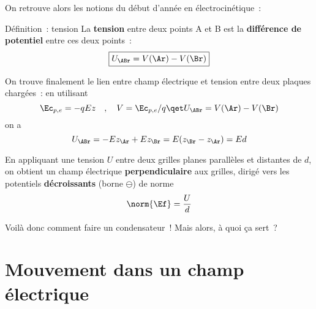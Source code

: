 \documentclass[../main/main.tex]{subfiles}
\begin{document}
On retrouve alors les notions du début d'année en électrocinétique~:

\begin{tdefi}{Définition~: tension}
    La \textbf{tension} entre deux points A et B est la \textbf{différence de
    potentiel} entre ces deux points~:
    \[\boxed{U_{\ABr} = V(\Ar) - V(\Br)}\]
\end{tdefi}

On trouve finalement le lien entre champ électrique et tension entre deux
plaques chargées~: en utilisant
\[
    \Ec_{p,e} = -qEz
    \quad,\quad
    V = \Ec_{p,e}/q
    \qet
    U_{\ABr} = V(\Ar) - V(\Br)
\]
on a
\[U_{\ABr} = -Ez_\Ar + Ez_\Br = E(z_\Br - z_\Ar) = Ed\]
\begin{tror}{}
    En appliquant une tension $U$ entre deux grilles planes parallèles et
    distantes de $d$, on obtient un champ électrique \textbf{perpendiculaire}
    aux grilles, dirigé vers les potentiels \textbf{décroissants} (borne
    $\ominus$) de norme
    \[\norm{\Ef} = \frac{U}{d}\]
\end{tror}

Voilà donc comment faire un condensateur~! Mais alors, à quoi ça sert~?

\section{Mouvement dans un champ électrique}
\end{document}
